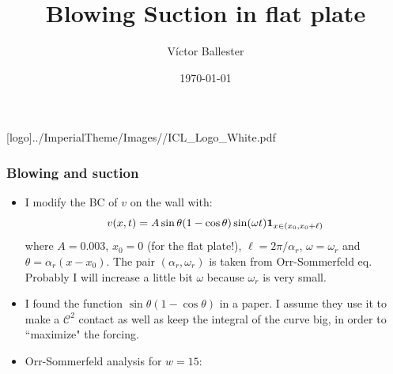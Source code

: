 \documentclass[
  aspectratio=169, %
  t, %
  onlytextwidth, %
  10pt, %
]{beamer}
\title{Blowing Suction in flat plate} %
\subtitle{} %
\author{Víctor Ballester} %
\date{\today} %
\def\imagefolder{../ImperialTheme/Images/}
\begin{document}
\begingroup
{} %
[logo]{\imagefolder/ICL_Logo_White.pdf} %
\frame[plain, s]{\titlepage} %
\endgroup

\begin{frame}
	\frametitle{Blowing and suction}
	\begin{itemize}
		\item I modify the BC of $v$ on the wall with:
		      $$
			      v(x,t)= A \sin\theta(1-\cos\theta)\sin(\omega t) {\bf{1}}_{x\in (x_0, x_0 + \ell)}
		      $$
		      where $A=0.003$, $x_0=0$ (for the flat plate!), $\ell = 2\pi/\alpha_r$, $\omega=\omega_r$ and $\theta = \alpha_r (x-x_0)$. The pair $(\alpha_r, \omega_r)$ is taken from Orr-Sommerfeld eq. Probably I will increase a little bit $\omega$ because $\omega_r$ is very small.
		\item I found the function $\sin\theta (1-\cos\theta)$ in a paper. I assume they use it to make a $\mathcal{C}^2$ contact as well as keep the integral of the curve big, in order to ``maximize" the forcing.
		\item Orr-Sommerfeld analysis for $w=15$:
	\end{itemize}


\end{frame}
\end{document}
